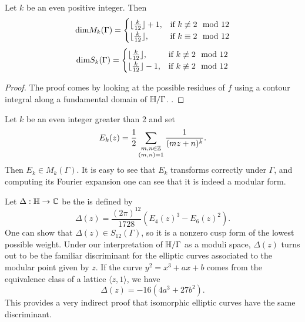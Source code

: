 \documentclass[12pt, a4paper]{amsart}
\begin{document}
\begin{prop}
  Let $k$ be an even positive integer. Then
  \[\textnormal{dim}M_k(\Gamma) =
    \begin{cases}
      \lfloor \frac{k}{12}  \rfloor + 1, & \text{if } k \not\equiv 2 \mod{12} \\
      \lfloor \frac{k}{12}  \rfloor, & \text{if } k \equiv 2 \mod{12} \\
    \end{cases}
\]
  \[\textnormal{dim}S_k(\Gamma) =
    \begin{cases}
      \lfloor \frac{k}{12}  \rfloor, & \text{if } k \not\equiv 2 \mod{12} \\
      \lfloor \frac{k}{12}  \rfloor - 1, & \text{if } k \not\equiv 2 \mod{12} \\
    \end{cases}
\]
\end{prop}
\begin{proof}
  The proof comes by looking at the possible residues of $f$ using a contour
  integral along a fundamental domain of $\mathbb{H} / \Gamma$.
  \cite[See][Propositions 8-9, Pages 115-118]{koblitz}. 
\end{proof}

\begin{example}
  Let $k$ be an even integer greater than 2 and set
  \[E_k(z) = \frac{1}{2} \sum_{\substack{m,n \in {\mathbb Z} \\ (m,n) =1}} \frac{1}{(mz+n)^k}.\]
  Then $E_k \in M_k(\Gamma).$ It is easy to see that $E_k$ transforms correctly
  under $\Gamma$, and computing its Fourier expansion one can see that it is
  indeed a modular form.
\end{example}

\begin{example}
  Let $\Delta : \mathbb{H} \rightarrow {\mathbb C} $ be the  is defined by
  \[\Delta(z) = \frac{(2\pi)^{12}}{1728} \left( E_4(z)^3 - E_6(z)^2 \right).\]
  One can show that $\Delta(z) \in S_{12}(\Gamma)$, so it is a nonzero
  cusp form of the lowest
  possible weight. Under our interpretation of $\mathbb{H}/\Gamma$ as a moduli space,
  $\Delta(z)$ turns out to be the familiar discriminant for
  the elliptic curves associated to the modular point given by $z$.
  If the curve $y^2 = x^3 + ax + b$ comes from the equivalence class of a lattice
  $\langle z,1 \rangle$, we have
  \[\Delta(z) = -16(4a^3 + 27b^2).\]
  This provides a very indirect proof that isomorphic elliptic curves have
  the same discriminant.
\end{example}
\end{document}
